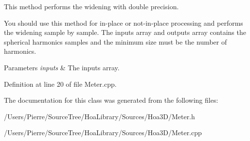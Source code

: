This method performs the widening with double precision. 

You should use this method for in-\/place or not-\/in-\/place processing and performs the widening sample by sample. The inputs array and outputs array contains the spherical harmonics samples and the minimum size must be the number of harmonics.


\begin{DoxyParams}{Parameters}
{\em inputs} & The inputs array. \\
\hline
\end{DoxyParams}


Definition at line 20 of file Meter.\-cpp.



The documentation for this class was generated from the following files\-:\begin{DoxyCompactItemize}
\item 
/\-Users/\-Pierre/\-Source\-Tree/\-Hoa\-Library/\-Sources/\-Hoa3\-D/Meter.\-h\item 
/\-Users/\-Pierre/\-Source\-Tree/\-Hoa\-Library/\-Sources/\-Hoa3\-D/Meter.\-cpp\end{DoxyCompactItemize}
